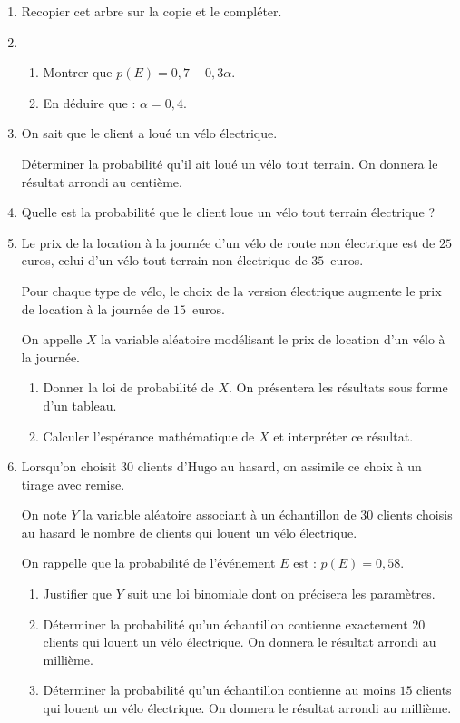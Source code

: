 \documentclass[10pt,a4paper]{article}
\begin{document}
\begin{enumerate}
\item Recopier cet arbre sur la copie et le compléter.
\item 
	\begin{enumerate}
		\item Montrer que $p(E) = 0,7 - 0,3\alpha$.
		\item En déduire que : $\alpha = 0,4$.
	\end{enumerate}
\item On sait que le client a loué un vélo électrique.

Déterminer la probabilité qu'il ait loué un vélo tout terrain. On donnera le résultat arrondi au centième.
\item Quelle est la probabilité que le client loue un vélo tout terrain électrique ?
\item Le prix de la location à la journée d'un vélo de route non électrique est de $25$ euros, celui d'un vélo tout terrain non électrique de $35$~euros.

Pour chaque type de vélo, le choix de la version électrique augmente le prix de location à la journée de $15$~euros.

On appelle $X$ la variable aléatoire modélisant le prix de location d'un vélo à la journée.
	\begin{enumerate}
		\item Donner la loi de probabilité de $X$. On présentera les résultats sous forme d'un tableau.
		\item Calculer l'espérance mathématique de $X$ et interpréter ce résultat.
	\end{enumerate}	
\item Lorsqu'on choisit $30$ clients d'Hugo au hasard, on assimile ce choix à un tirage avec remise.

On note $Y$ la variable aléatoire associant à un échantillon de $30$ clients choisis au hasard le nombre de clients qui louent un vélo électrique.

On rappelle que la probabilité de l'événement $E$ est : $p(E) = 0,58$.
	\begin{enumerate}
		\item Justifier que $Y$ suit une loi binomiale dont on précisera les paramètres.
		\item Déterminer la probabilité qu'un échantillon contienne exactement $20$ clients qui louent un vélo électrique. On donnera le résultat arrondi au millième.
		\item Déterminer la probabilité qu'un échantillon contienne au moins $15$ clients qui louent un vélo électrique. On donnera le résultat arrondi au millième.
	\end{enumerate}
\end{enumerate}
\end{document}
